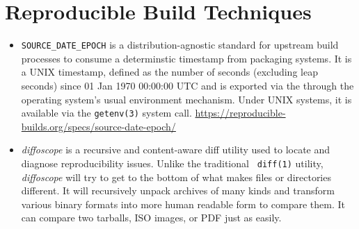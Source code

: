 \section{Reproducible Build Techniques}
\label{SEC:techniques}


\begin{itemize}

\item {\tt SOURCE\_DATE\_EPOCH} is a distribution-agnostic standard for
upstream build processes to consume a determinstic timestamp from packaging
systems. It is a UNIX timestamp, defined as the number of seconds
(excluding leap seconds) since 01 Jan 1970 00:00:00 UTC and is exported via
the through the operating system's usual environment mechanism. Under UNIX
systems, it is available via the {\tt getenv(3)} system call.
\url{https://reproducible-builds.org/specs/source-date-epoch/}

\item {\em diffoscope} is a recursive and content-aware diff utility used
to locate and diagnose reproducibility issues. Unlike the traditional {\tt
diff(1)} utility, {\em diffoscope} will try to get to the bottom of what
makes files or directories different. It will recursively unpack archives
of many kinds and transform various binary formats into more human readable
form to compare them. It can compare two tarballs, ISO images, or PDF just
as easily.

\end{itemize}
